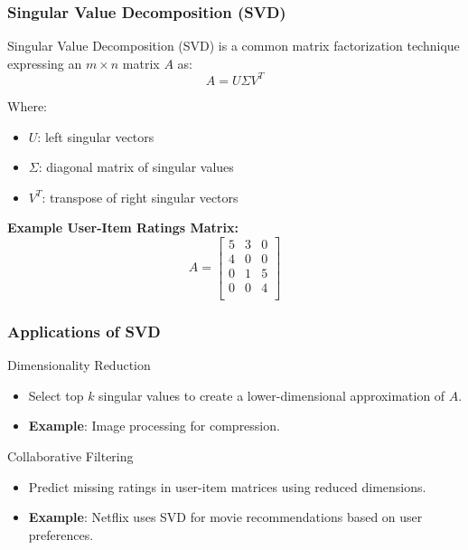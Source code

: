 \documentclass{beamer}
\begin{document}
\begin{frame}
    \frametitle{Singular Value Decomposition (SVD)}
    Singular Value Decomposition (SVD) is a common matrix factorization technique expressing an \( m \times n \) matrix \( A \) as:
    \begin{equation}
        A = U \Sigma V^T
    \end{equation}
    
    Where:
    \begin{itemize}
        \item \( U \): left singular vectors
        \item \( \Sigma \): diagonal matrix of singular values
        \item \( V^T \): transpose of right singular vectors
    \end{itemize}
    
    \textbf{Example User-Item Ratings Matrix:}
    \begin{equation}
    A = \begin{bmatrix}
        5 & 3 & 0 \\
        4 & 0 & 0 \\
        0 & 1 & 5 \\
        0 & 0 & 4 \\
    \end{bmatrix}
    \end{equation}
\end{frame}

\begin{frame}[fragile]
    \frametitle{Applications of SVD}
    \begin{block}{Dimensionality Reduction}
        \begin{itemize}
            \item Select top \( k \) singular values to create a lower-dimensional approximation of \( A \).
            \item \textbf{Example}: Image processing for compression.
        \end{itemize}
    \end{block}
    
    \begin{block}{Collaborative Filtering}
        \begin{itemize}
            \item Predict missing ratings in user-item matrices using reduced dimensions.
            \item \textbf{Example}: Netflix uses SVD for movie recommendations based on user preferences.
        \end{itemize}
    \end{block}
\end{frame}
\end{document}
